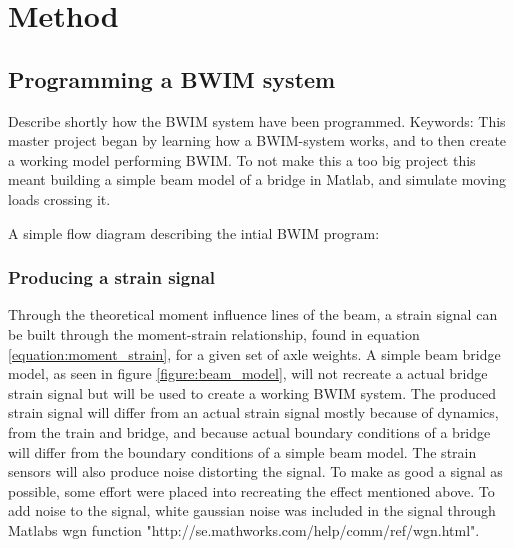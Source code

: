 \chapter{Method}

\section{Programming a BWIM system}
Describe shortly how the BWIM system have been programmed.
Keywords:
This master project began by learning how a BWIM-system works, and to then create a working model performing BWIM. To not make this a too big project this meant building a simple beam model of a bridge in Matlab, and simulate moving loads crossing it.

A simple flow diagram describing the intial BWIM program:
\begin{figure}[H]
	\centering
	
\end{figure}


\subsection{Producing a strain signal}
Through the theoretical moment influence lines of the beam, a strain signal can be built through the moment-strain relationship, found in equation \ref{equation:moment_strain}, for a given set of axle weights. A simple beam bridge model, as seen in figure \ref{figure:beam_model}, will not recreate a actual bridge strain signal but will be used to create a working BWIM system. The produced strain signal will differ from an actual strain signal mostly because of dynamics, from the train and bridge, and because actual boundary conditions of a bridge will differ from the boundary conditions of a simple beam model. The strain sensors will also produce noise distorting the signal.
To make as good a signal as possible, some effort were placed into recreating the effect mentioned above. To add noise to the signal, white gaussian noise was included in the signal through Matlabs wgn function "http://se.mathworks.com/help/comm/ref/wgn.html".


